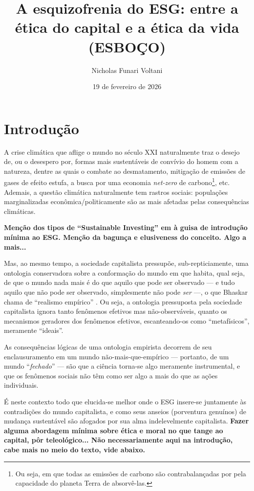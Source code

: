 \documentclass[12pt]{article}
\title{A esquizofrenia do ESG: entre a ética do capital e a ética da vida (\textbf{ESBOÇO})}
\author{Nicholas Funari Voltani}
\date{19 de fevereiro de 2026}
\begin{document}
\maketitle





\section{Introdução}
A crise climática que aflige o mundo no século XXI naturalmente traz o desejo de, ou o desespero por, formas mais sustentáveis de convívio do homem com a natureza, dentre as quais o combate ao desmatamento, mitigação de emissões de gases de efeito estufa, a busca por uma economia \textit{net-zero} de carbono\footnote{Ou seja, em que todas as emissões de carbono são contrabalançadas por pela capacidade do planeta Terra de absorvê-las.}, etc. Ademais, a questão climática naturalmente tem rastros sociais: populações marginalizadas econômica/politicamente são as mais afetadas pelas consequências climáticas. 

\textbf{Menção dos tipos de ``Sustainable Investing'' em \cite{Fichtner2024} à guisa de introdução mínima ao ESG. Menção da bagunça e elusiveness do conceito. Algo a mais...} 



Mas, ao mesmo tempo, a sociedade capitalista pressupõe, sub-repticiamente, uma ontologia conservadora sobre a conformação do mundo em que habita, qual seja, de que o mundo nada mais é do que aquilo que pode ser observado --- e tudo aquilo que não pode ser observado, simplesmente não pode \textit{ser} ---, o que Bhaskar chama de “realismo empírico” \cite{Bhaskar1978}. Ou seja, a ontologia pressuposta pela sociedade capitalista ignora tanto fenômenos efetivos mas não-observáveis, quanto os mecanismos geradores dos fenômenos efetivos, escanteando-os como “metafísicos”, meramente “ideais”.

As consequências lógicas de uma ontologia empirista decorrem de seu enclausuramento em um mundo não-mais-que-empírico --- portanto, de um mundo ``\textit{fechado}'' --- são que a ciência torna-se algo meramente instrumental, e que os fenômenos sociais não têm como ser algo a mais do que as ações individuais.

É neste contexto todo que elucida-se melhor onde o ESG insere-se juntamente às contradições do mundo capitalista, e como seus anseios (porventura genuínos) de mudança sustentável são afogados por sua alma indelevelmente capitalista.
\textbf{Fazer alguma abordagem mínima sobre ética e moral no que tange ao capital, pôr teleológico... Não necessariamente aqui na introdução, cabe mais no meio do texto, vide abaixo. \cite{Medeiros2013,Medeiros2013a,Medeiros2016}} 
\end{document}
